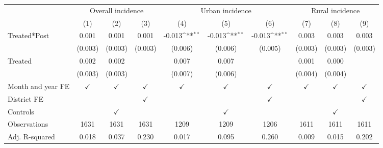 {
\def\sym#1{\ifmmode^{#1}\else\(^{#1}\)\fi}
\begin{tabular}{l*{9}{c}}
\hline\hline
                &\multicolumn{3}{c}{Overall incidence}                   &\multicolumn{3}{c}{Urban incidence}                     &\multicolumn{3}{c}{Rural incidence}                     \\\cmidrule(lr){2-4}\cmidrule(lr){5-7}\cmidrule(lr){8-10}
                &      (1)         &      (2)         &      (3)         &      (4)         &      (5)         &      (6)         &      (7)         &      (8)         &      (9)         \\
\hline
Treated*Post    &    0.001         &    0.001         &    0.001         &   -0.013\sym{**} &   -0.013\sym{**} &   -0.013\sym{**} &    0.003         &    0.003         &    0.003         \\
                &  (0.003)         &  (0.003)         &  (0.003)         &  (0.006)         &  (0.006)         &  (0.005)         &  (0.003)         &  (0.003)         &  (0.003)         \\
Treated         &    0.002         &    0.002         &                  &    0.007         &    0.007         &                  &    0.001         &    0.000         &                  \\
                &  (0.003)         &  (0.003)         &                  &  (0.007)         &  (0.006)         &                  &  (0.004)         &  (0.004)         &                  \\
Month and year FE&$\checkmark$         &$\checkmark$         &$\checkmark$         &$\checkmark$         &$\checkmark$         &$\checkmark$         &$\checkmark$         &$\checkmark$         &$\checkmark$         \\
District FE     &                  &                  &$\checkmark$         &                  &                  &$\checkmark$         &                  &                  &$\checkmark$         \\
Controls        &                  &$\checkmark$         &                  &                  &$\checkmark$         &                  &                  &$\checkmark$         &                  \\
\hline
Observations    &\num{1631}         &\num{1631}         &\num{1631}         &\num{1209}         &\num{1209}         &\num{1206}         &\num{1611}         &\num{1611}         &\num{1611}         \\
Adj. R-squared  &    0.018         &    0.037         &    0.230         &    0.017         &    0.095         &    0.260         &    0.009         &    0.015         &    0.202         \\

\end{tabular}}
